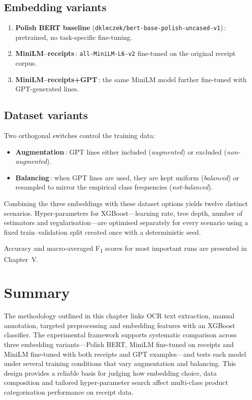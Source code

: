 \documentclass{SGGW-thesis-EN}
\begin{document}
\subsection*{Embedding variants}
\begin{enumerate}
  \item \textbf{Polish BERT baseline} (\texttt{dkleczek/bert-base-polish-uncased-v1})\,: pretrained, no task-specific
        fine-tuning.
  \item \textbf{MiniLM–receipts}\,: \texttt{all-MiniLM-L6-v2} fine-tuned on the original receipt corpus.
  \item \textbf{MiniLM–receipts+GPT}\,: the same MiniLM model further fine-tuned with GPT-generated lines.
\end{enumerate}

\subsection*{Dataset variants}
Two orthogonal switches control the training data:
\begin{itemize}
  \item \textbf{Augmentation}\,: GPT lines either included (\emph{augmented}) or excluded (\emph{non-augmented}).
  \item \textbf{Balancing}\,: when GPT lines are used, they are kept uniform (\emph{balanced}) or resampled to mirror the
        empirical class frequencies (\emph{not-balanced}).
\end{itemize}

Combining the three embeddings with these dataset options yields twelve distinct scenarios. Hyper-parameters for
XGBoost—learning rate, tree depth, number of estimators and regularisation—are optimised separately for every scenario
using a fixed train–validation split created once with a deterministic seed.

Accuracy and macro-averaged F\textsubscript{1} scores for most important runs are presented in Chapter~V.

\section{Summary}
The methodology outlined in this chapter links OCR text extraction, manual annotation, targeted preprocessing and
embedding features with an XGBoost classifier. The experimental framework supports systematic comparison across three
embedding variants—Polish BERT, MiniLM fine-tuned on receipts and MiniLM fine-tuned with both receipts and GPT
examples—and tests each model under several training conditions that vary augmentation and balancing. This design
provides a reliable basis for judging how embedding choice, data composition and tailored hyper-parameter search affect
multi-class product categorisation performance on receipt data.
\end{document}
